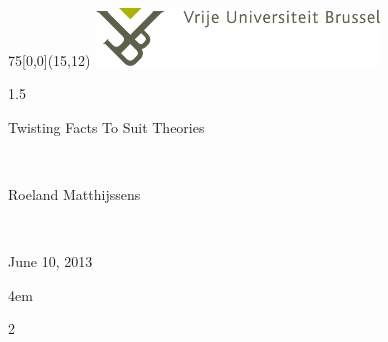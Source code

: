 \documentclass[10pt,a4paper]{scrartcl}
\begin{document}
\begin{textblock}{75}[0,0](15,12)
  \includegraphics[width=75.5mm]{VUB_logo_kleur.png}
\end{textblock}

\begin{center}
\begin{spacing}{1.5}
\begin{LARGE}
Twisting Facts To Suit Theories
\end{LARGE}
\\
\begin{large}
Roeland Matthijssens
\end{large}
\\
\begin{large}
June 10, 2013
\end{large}
\end{spacing}
\end{center}
\begingroup
\leftskip4em
\rightskip\leftskip

\par
\endgroup

\begin{multicols}{2}

\end{multicols}
\end{document}
